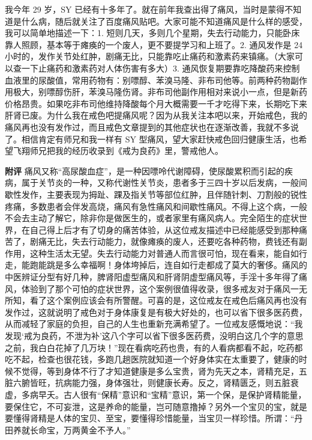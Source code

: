\begin{case}
    我今年 29 岁，SY 已经有十多年了。就在前年我查出得了痛风，当时是蒙得不知道是什么病，随后就关注了百度痛风贴吧。大家可能不知道痛风是什么样的感受，我可以简单地描述一下：1. 短则几天，多则几个星期，失去行动能力，只能卧床靠人照顾，基本等于瘫痪的一个废人，更不要提学习和上班了。2. 通风发作是 24 小时的，发作关节处红肿，剧痛无比，只能靠吃止痛药和激素药来镇痛。（大家可以查一下止痛药和激素药对人体伤害有多大）3. 通风恢复期要靠吃降酸药来控制血液里的尿酸值，常用药物有：别嘌醇、苯溴马隆、非布司他等。前两种药物副作用极大，别嘌醇伤肝，苯溴马隆伤肾。非布司他副作用相对来说小一点，但是新药价格昂贵。如果吃非布司他维持降酸每个月大概需要一千才吃得下来，长期吃下来肝肾已废。为什么我在戒色吧提痛风呢？因为从我关注本吧以来，开始戒色，我的痛风再也没有发作过，而且戒色文章提到的其他症状也在逐渐改善，我就不多说了。相信肯定有师兄和我一样有 SY 型痛风，望大家赶快戒色回归健康生活，也希望飞翔师兄把我的经历收录到《戒为良药》里，警戒他人。

    \textbf{附评} 痛风又称“高尿酸血症”，是一种因嘌呤代谢障碍，使尿酸累积而引起的疾病，属于关节炎的一种，又称代谢性关节炎，患者多于三四十岁以后发病，一般间歇性发作，主要表现为拇趾、踝及指关节等部位红肿，且伴随针刺、刀割般的锐性疼痛，多数患者会伴发高烧，痛风有急性痛风和间歇性痛风。不得上这个病，一般不会去主动了解它，除非你是做医生的，或者家里有痛风病人。完全陌生的症状世界，在自己得上后才有了切身的痛苦体验，从这位戒友描述中已经能感受到那种痛苦了，剧痛无比，失去行动能力，就像瘫痪的废人，还要吃各种药物，费钱还有副作用，这种生活太无望。失去行动能力对普通人而言很可怕，现在看来，能自如行走，能跑能跳是多么幸福啊！身体垮掉后，连自如行走都成了莫大的奢侈。痛风的中医辨证分型有好几种，脾肾阳虚型痛风和肝肾阴虚型痛风等，手淫十多年得了痛风，体验到了那个可怕的症状世界，这个案例很值得收录，很多戒友对于痛风一无所知，看了这个案例应该会有所警醒。可喜的是，这位戒友在戒色后痛风再也没有发作过，这就说明了戒色对于身体康复是有极大好处的，也可以省下很多医药费，从而减轻了家庭的负担，自己的人生也重新充满希望了。一位戒友感慨地说：“我发现‘戒为良药，不泄为补’这八个字可以省下很多医药费，没明白这几个字的意思之前，我白白花掉了几万块！”现在看病吃药也贵，有的人看病都看不起，吃药都吃不起，检查也很花钱，多跑几趟医院就知道一个好身体实在太重要了，健康的时候不觉得，等到身体不行了才知道健康是多么宝贵，肾为先天之本，肾精充足，五脏六腑皆旺，抗病能力强，身体强壮，则健康长寿。反之，肾精匮乏，则五脏衰虚，多病早夭。古人很有“保精”意识和“宝精”意识，第一个保，是保护肾精能量，要保住它，不可妄泄，这是养命的能量，岂可随意撸掉？另外一个宝贝的宝，就是要懂得肾精是人体的宝贝、至宝，要懂得珍惜能量，当宝贝一样珍惜。所谓：“丹田养就长命宝，万两黄金不予人。”
\end{case}

